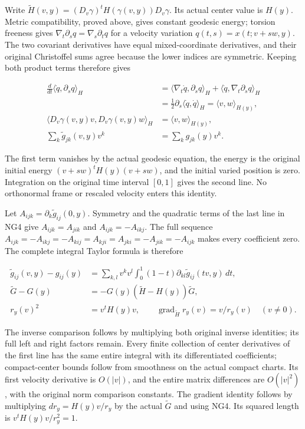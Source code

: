 \documentclass[
  11pt,
]{article}
\begin{document}
Write \(\widetilde H(v,y)=(D_v\gamma)^tH(\gamma(v,y))D_v\gamma\). Its
actual center value is \(H(y)\). Metric compatibility, proved above,
gives constant geodesic energy; torsion freeness gives
\(\nabla_t\partial_s q=\nabla_s\partial_tq\) for a velocity variation
\(q(t,s)=x(t;v+sw,y)\). The two covariant derivatives have equal
mixed-coordinate derivatives, and their original Christoffel sums agree
because the lower indices are symmetric. Keeping both product terms
therefore gives

\[
 \begin{aligned}
 \frac d{dt}\langle\dot q,\partial_s q\rangle_H
 &=\langle\nabla_t\dot q,\partial_s q\rangle_H
       +\langle\dot q,\nabla_t\partial_s q\rangle_H\\
 &=\tfrac12\partial_s\langle\dot q,\dot q\rangle_H
       =\langle v,w\rangle_{H(y)},\\
 \langle D_v\gamma(v,y)v,D_v\gamma(v,y)w\rangle_H
 &=\langle v,w\rangle_{H(y)},\\
 \sum_k\widetilde g_{jk}(v,y)v^k&=\sum_k g_{jk}(y)v^k.
 \end{aligned}
 \tag{NG4}
\]

The first term vanishes by the actual geodesic equation, the energy is
the original initial energy \((v+sw)^tH(y)(v+sw)\), and the initial
varied position is zero. Integration on the original time interval
\([0,1]\) gives the second line. No orthonormal frame or rescaled
velocity enters this identity.

Let \(A_{ijk}=\partial_k\widetilde g_{ij}(0,y)\). Symmetry and the
quadratic terms of the last line in NG4 give \(A_{ijk}=A_{jik}\) and
\(A_{ijk}=-A_{ikj}\). The full sequence
\(A_{ijk}=-A_{ikj}=-A_{kij}=A_{kji}=A_{jki}=-A_{jik}=-A_{ijk}\) makes
every coefficient zero. The complete integral Taylor formula is
therefore

\[
 \begin{aligned}
 \widetilde g_{ij}(v,y)-g_{ij}(y)
 &=\sum_{k,l}v^kv^l\int_0^1
            (1-t)\partial_{kl}\widetilde g_{ij}(tv,y)\,dt,\\
 \widetilde G-G(y)
 &=-G(y)(\widetilde H-H(y))\widetilde G,\\
 r_y(v)^2&=v^tH(y)v,\qquad
 \operatorname{grad}_{\widetilde H}r_y(v)=v/r_y(v)
                         \quad(v\ne0).
 \end{aligned}
 \tag{NG5}
\]

The inverse comparison follows by multiplying both original inverse
identities; its full left and right factors remain. Every finite
collection of center derivatives of the first line has the same entire
integral with its differentiated coefficients; compact-center bounds
follow from smoothness on the actual compact charts. Its first velocity
derivative is \(O(|v|)\), and the entire matrix differences are
\(O(|v|^2)\), with the original norm comparison constants. The gradient
identity follows by multiplying \(dr_y=H(y)v/r_y\) by the actual
\(\widetilde G\) and using NG4. Its squared length is
\(v^tH(y)v/r_y^2=1\).
\end{document}
